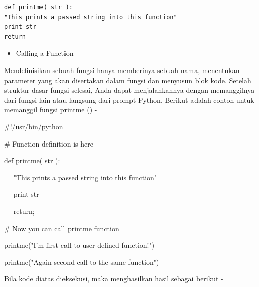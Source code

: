 \begin{verbatim}
def printme( str ): 
"This prints a passed string into this function" 
print str 
return 
\end{verbatim}

\vspace{\baselineskip}
\noindent 
\begin{itemize}
	\item Calling a Function 
\end{itemize}
\noindent 
Mendefinisikan sebuah fungsi hanya memberinya sebuah nama, menentukan parameter yang akan disertakan dalam fungsi dan menyusun blok kode. Setelah struktur dasar fungsi selesai, Anda dapat menjalankannya dengan memanggilnya dari fungsi lain atau langsung dari prompt Python. Berikut adalah contoh untuk memanggil fungsi printme () - \par
\vspace{\baselineskip}
\noindent 
 \hspace*{0.5in}  $  \#  $!/usr/bin/python \par
\vspace{12pt}
\noindent 
 \hspace*{0.5in}  $  \#  $ Function definition is here \par
\noindent 
 \hspace*{0.5in} def printme( str ): \par
 \vspace{\baselineskip}
\noindent 
~~  \hspace*{0.5in}  "This prints a passed string into this function" \par
\noindent 
~~  \hspace*{0.5in} print str \par
\noindent 
~~  \hspace*{0.5in} return; \par
\vspace{12pt}
\noindent 
 \hspace*{0.5in}  $  \#  $ Now you can call printme function \par
\noindent 
 \hspace*{0.5in} printme("I'm first call to user defined function!") \par
\noindent 
 \hspace*{0.5in} printme("Again second call to the same function") \par
 \vspace{\baselineskip}
\noindent 
Bila kode diatas dieksekusi, maka menghasilkan hasil sebagai berikut - \par
